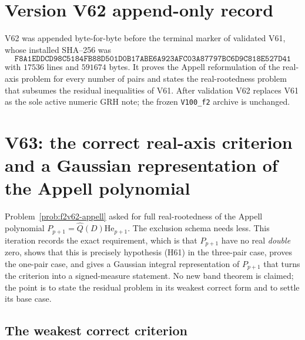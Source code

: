 \documentclass[11pt]{article}
\theoremstyle{definition}
\theoremstyle{remark}
\begin{document}
\section*{Version V62 append-only record}

V62 was appended byte-for-byte before the terminal marker of validated
V61, whose installed SHA--256 was
\[
 \texttt{F8A1EDDCD98C5184FB88D501D0B17ABE}
 \allowbreak\texttt{6A923AFC03A87797BC6D9C818E527D41}
\]
with \(17536\) lines and \(591674\) bytes.  It proves the Appell
reformulation of the real-axis problem for every number of pairs and
states the real-rootedness problem that subsumes the residual
inequalities of V61.  After validation V62 replaces V61 as the sole
active numeric GRH note; the frozen \texttt{V100\_f2} archive is
unchanged.





\clearpage
\section{V63: the correct real-axis criterion and a Gaussian representation of the Appell polynomial}
\label{sec:f2v63-criterion}
\begingroup
\setcounter{equation}{0}
\renewcommand{\theequation}{N63.\arabic{equation}}
\renewcommand{\theHequation}{f2v63.\arabic{equation}}

Problem~\ref{prob:f2v62-appell} asked for full real-rootedness of the
Appell polynomial \(P_{p+1}=\widehat Q(D)\mathrm{He}_{p+1}\).  The
exclusion schema needs less.  This iteration records the exact
requirement, which is that \(P_{p+1}\) have no real \emph{double} zero,
shows that this is precisely hypothesis (H61) in the three-pair case,
proves the one-pair case, and gives a Gaussian integral representation of
\(P_{p+1}\) that turns the criterion into a signed-measure statement.  No
new band theorem is claimed; the point is to state the residual problem
in its weakest correct form and to settle its base case.

\subsection{The weakest correct criterion}
\end{document}
